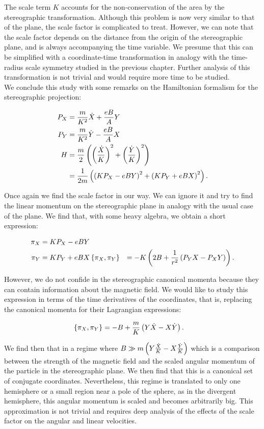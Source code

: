 The scale term $K$ accounts for the non-conservation of the area by the stereographic transformation. Although this problem is now very similar to that of the plane, the scale factor is complicated to treat. However, we can note that the scale factor depends on the distance from the origin of the stereographic plane, and is always accompanying the time variable. We presume that this can be simplified with a coordinate-time transformation in analogy with the time-radius scale symmetry studied in the previous chapter. Further analysis of this transformation is not trivial and would require more time to be studied.\\

We conclude this study with some remarks on the Hamiltonian formalism for the stereographic projection:

\begin{align*}
P_X &= \frac{m}{K^2}\dot{X} + \frac{eB}{A}Y\\
P_Y &= \frac{m}{K^2}\dot{Y} - \frac{eB}{A}X\\
H &= \frac{m}{2}\left( \left( \frac{\dot{X}}{K} \right)^2+\left( \frac{\dot{Y}}{K} \right)^2 \right)\\
&= \frac{1}{2m}\left( \left( KP_X-eBY \right)^2+\left( KP_Y+eBX \right)^2 \right).
\end{align*}

Once again we find the scale factor in our way. We can ignore it and try to find the linear momentum on the stereographic plane in analogy with the usual case of the plane. We find that, with some heavy algebra, we obtain a short expression:

\begin{align*}
\pi_X &= KP_X-eBY\\
\pi_Y &= KP_Y+eBX
\left\lbrace \pi_X, \pi_Y \right\rbrace &= -K\left( 2B + \frac{1}{r^2}\left( P_YX-P_XY \right) \right).
\end{align*}

However, we do not confide in the stereographic canonical momenta because they can contain information about the magnetic field. We would like to study this expression in terms of the time derivatives of the coordinates, that is, replacing the canonical momenta for their Lagrangian expressions:

\begin{align*}
\left\lbrace \pi_X, \pi_Y \right\rbrace &= -B + \frac{m}{K}\left( Y\dot{X}-X\dot{Y} \right).
\end{align*}

We find then that in a regime where $B \gg  m\left( Y\frac{\dot{X}}{K}-X\frac{\dot{Y}}{K} \right)$ which is a comparison between the strength of the magnetic field and the scaled angular momentum of the particle in the stereographic plane. We then find that this is a canonical set of conjugate coordinates. Nevertheless, this regime is translated to only one hemisphere or a small region near a pole of the sphere, as in the divergent hemisphere, this angular momentum is scaled and becomes arbitrarily big. This approximation is not trivial and requires deep analysis of the effects of the scale factor on the angular and linear velocities.\\

